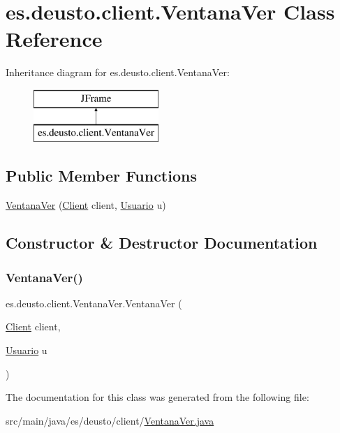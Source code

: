 \hypertarget{classes_1_1deusto_1_1client_1_1_ventana_ver}{}\section{es.\+deusto.\+client.\+Ventana\+Ver Class Reference}
\label{classes_1_1deusto_1_1client_1_1_ventana_ver}
Inheritance diagram for es.\+deusto.\+client.\+Ventana\+Ver\+:\begin{figure}[H]
\begin{center}
\leavevmode
\includegraphics[height=2.000000cm]{classes_1_1deusto_1_1client_1_1_ventana_ver}
\end{center}
\end{figure}
\subsection*{Public Member Functions}
\begin{DoxyCompactItemize}
\item 
\mbox{\hyperlink{classes_1_1deusto_1_1client_1_1_ventana_ver_ac53c302eabef4830a1c0fa0831e3cff8}{Ventana\+Ver}} (\mbox{\hyperlink{classes_1_1deusto_1_1client_1_1_client}{Client}} client, \mbox{\hyperlink{classes_1_1deusto_1_1server_1_1jdo_1_1_usuario}{Usuario}} u)
\end{DoxyCompactItemize}


\subsection{Constructor \& Destructor Documentation}
\mbox{\label{classes_1_1deusto_1_1client_1_1_ventana_ver_ac53c302eabef4830a1c0fa0831e3cff8}} 
\subsubsection{\texorpdfstring{VentanaVer()}{VentanaVer()}}
{\footnotesize\ttfamily es.\+deusto.\+client.\+Ventana\+Ver.\+Ventana\+Ver (\begin{DoxyParamCaption}\item[{\mbox{\hyperlink{classes_1_1deusto_1_1client_1_1_client}{Client}}}]{client,  }\item[{\mbox{\hyperlink{classes_1_1deusto_1_1server_1_1jdo_1_1_usuario}{Usuario}}}]{u }\end{DoxyParamCaption})}



The documentation for this class was generated from the following file\+:\begin{DoxyCompactItemize}
\item 
src/main/java/es/deusto/client/\mbox{\hyperlink{_ventana_ver_8java}{Ventana\+Ver.\+java}}\end{DoxyCompactItemize}
